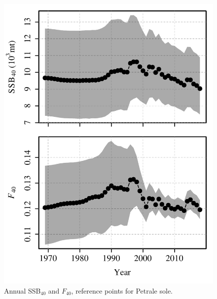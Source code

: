 \documentclass[
]{article}
\begin{document}
\begin{figure}
\caption{Annual SSB$_{40}$ and $F_{40}$, reference points for Petrale sole.}\label{BRPs}
\begin{center}
\includegraphics[height = 0.8\textheight]{../results/ssm_temp/petrale_BRPs.pdf}
\end{center}
\end{figure}
\end{document}
